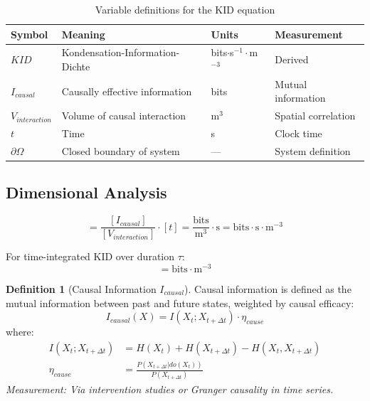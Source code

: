 \documentclass[11pt,a4paper]{article}
\theoremstyle{definition}
\newtheorem{definition}{Definition}[section]
\begin{document}
\begin{table}[h]
\centering
\begin{tabular}{@{}llll@{}}
\toprule
\textbf{Symbol} & \textbf{Meaning} & \textbf{Units} & \textbf{Measurement} \\
\midrule
$KID$ & Kondensation-Information-Dichte & bits$\cdot$s$^{-1}\cdot$m$^{-3}$ & Derived \\
$I_{causal}$ & Causally effective information & bits & Mutual information \\
$V_{interaction}$ & Volume of causal interaction & m$^3$ & Spatial correlation \\
$t$ & Time & s & Clock time \\
$\partial\Omega$ & Closed boundary of system & --- & System definition \\
\bottomrule
\end{tabular}
\caption{Variable definitions for the KID equation}
\end{table}

\subsection{Dimensional Analysis}
\begin{equation}
[KID] = \frac{[I_{causal}]}{[V_{interaction}]} \cdot [t] = \frac{\text{bits}}{\text{m}^3} \cdot \text{s} = \text{bits} \cdot \text{s} \cdot \text{m}^{-3}
\end{equation}

For time-integrated KID over duration $\tau$:
\begin{equation}
[KID_{integrated}] = \text{bits} \cdot \text{m}^{-3}
\end{equation}

\begin{definition}[Causal Information $I_{causal}$]
Causal information is defined as the mutual information between past and future states, weighted by causal efficacy:
\begin{equation}
I_{causal}(X) = I(X_{t}; X_{t+\Delta t}) \cdot \eta_{cause}
\end{equation}
where:
\begin{align}
I(X_{t}; X_{t+\Delta t}) &= H(X_{t}) + H(X_{t+\Delta t}) - H(X_{t}, X_{t+\Delta t}) \\
\eta_{cause} &= \frac{P(X_{t+\Delta t} | do(X_{t}))}{P(X_{t+\Delta t})}
\end{align}
\textit{Measurement: Via intervention studies or Granger causality in time series.}
\end{definition}
\end{document}
